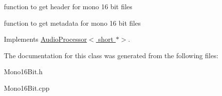 function to get header for mono 16 bit files 

function to get metadata for mono 16 bit files 

Implements \hyperlink{classAudioProcessor}{Audio\+Processor$<$ short $\ast$$>$}.



The documentation for this class was generated from the following files\+:\begin{DoxyCompactItemize}
\item 
Mono16\+Bit.\+h\item 
Mono16\+Bit.\+cpp\end{DoxyCompactItemize}
